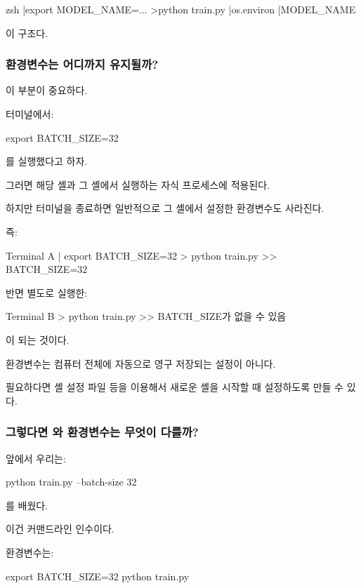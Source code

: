 \begin{dhkdir}[in=6]
zsh
|export MODEL_NAME=...
>python train.py
|os.environ
|MODEL_NAME
\end{dhkdir}

이 구조다.

\subsubsection{환경변수는 어디까지 유지될까?}

이 부분이 중요하다.

터미널에서:

\begin{dhkzsh}
export BATCH_SIZE=32
\end{dhkzsh}

를 실행했다고 하자.

그러면 해당 셸과 그 셸에서 실행하는 자식 프로세스에 적용된다.

하지만 터미널을 종료하면 일반적으로 그 셸에서 설정한 환경변수도 사라진다.

즉:

\begin{dhkdir}
Terminal A
| export BATCH_SIZE=32
> python train.py
>> BATCH_SIZE=32
\end{dhkdir}

반면 별도로 실행한:

\begin{dhkdir}
Terminal B
> python train.py
>> BATCH_SIZE가 없을 수 있음
\end{dhkdir}

이 되는 것이다.

환경변수는 컴퓨터 전체에 자동으로 영구 저장되는 설정이 아니다.

필요하다면 셸 설정 파일 등을 이용해서 새로운 셸을 시작할 때 설정하도록 만들 수 있다.

\subsubsection{그렇다면 와 환경변수는 무엇이 다를까?}

앞에서 우리는:

\begin{dhkzsh}
python train.py --batch-size 32
\end{dhkzsh}

를 배웠다.

이건 커맨드라인 인수이다.

환경변수는:

\begin{dhkzsh}
export BATCH_SIZE=32
python train.py
\end{dhkzsh}

